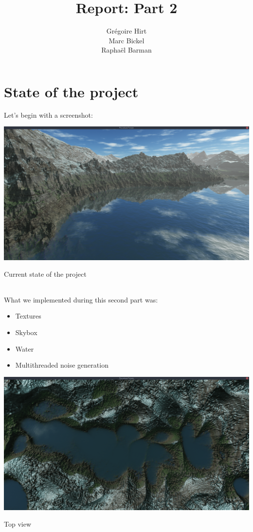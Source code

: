 \documentclass[11pt]{article}
\begin{document}
\setlength{\parindent}{0pt}
%
\author{Grégoire Hirt\\ Marc Bickel\\ Raphaël Barman}
\title{\vspace{-2.0cm}Report: Part 2}
\maketitle
\vspace{-1cm}
\section{State of the project}
Let's begin with a screenshot:
\begin{center}
\includegraphics[width=\textwidth]{screen04}
\caption{Current state of the project}
\end{center} \\

What we implemented during this second part was:
\begin{itemize}
\item Textures
\item Skybox
\item Water
\item Multithreaded noise generation
\end{itemize}

\begin{center}
\includegraphics[width=\textwidth]{screen05}
\caption{Top view}
\end{center} 
\end{document}
